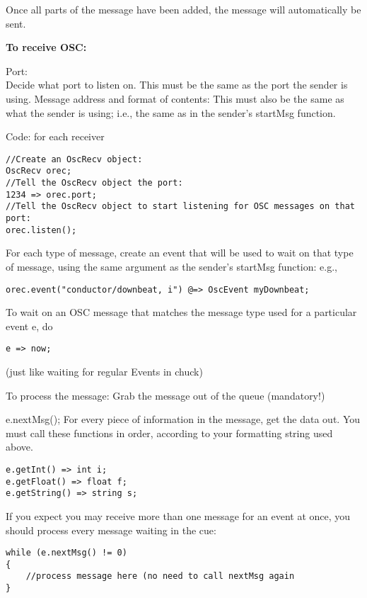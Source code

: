 Once all parts of the message have been added, the message will automatically be sent.

\textbf{To receive OSC: }

Port: \\
Decide what port to listen on. This must be the same as the port the sender is using. Message address and format of contents: This must also be the same as what the sender is using; i.e., the same as in the sender's startMsg function. 

Code: for each receiver 
\begin{verbatim}
//Create an OscRecv object: 
OscRecv orec; 
//Tell the OscRecv object the port: 
1234 => orec.port; 
//Tell the OscRecv object to start listening for OSC messages on that port: 
orec.listen(); 
\end{verbatim}

For each type of message, create an event that will be used to wait on that type of message, using the same argument as the sender's startMsg function: e.g., 

\begin{verbatim}
orec.event("conductor/downbeat, i") @=> OscEvent myDownbeat; 
\end{verbatim}

To wait on an OSC message that matches the message type used for a particular event e, do 
\begin{verbatim}
e => now; 
\end{verbatim}

(just like waiting for regular Events in chuck) 

To process the message: Grab the message out of the queue (mandatory!) 

e.nextMsg(); 
For every piece of information in the message, get the data out. You must call these functions in order, according to your formatting string used above. 
\begin{verbatim}
e.getInt() => int i; 
e.getFloat() => float f; 
e.getString() => string s; 
\end{verbatim}

If you expect you may receive more than one message for an event at once, you should process every message waiting in the cue: 

\begin{verbatim}
while (e.nextMsg() != 0) 
{ 
	//process message here (no need to call nextMsg again 
}
\end{verbatim}


